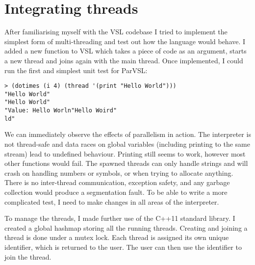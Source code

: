\section{Integrating threads}
\label{sec:babythreads}
After familiarising myself with the VSL codebase I tried to implement the simplest form of
multi-threading and test out how the language would behave. I added a new function to VSL
which takes a piece of code as an argument, starts a new thread and joins again with
the main thread. Once implemented, I could run the first and simplest unit test for ParVSL:

\begin{verbatim}
> (dotimes (i 4) (thread '(print "Hello World")))
"Hello World"
"Hello World"
"Value: Hello Worln"Hello Woird"
ld"
\end{verbatim}

We can immediately observe the effects of parallelism in action. The interpreter is not thread-safe and data races
on global variables (including printing to the same stream) lead to undefined behaviour. Printing
still seems to work, however most other functions would fail. The spawned threads can only handle strings
and will crash on handling numbers or symbols, or when trying to allocate anything.
There is no inter-thread communication, exception safety, and any garbage collection would produce a segmentation
fault. To be able to write a more complicated test, I need to make changes in all areas of the interpreter.

To manage the threads, I made further use of the C++11 standard library. I created a global hashmap storing
all the running threads. Creating and joining a thread is done under a mutex lock. Each thread is assigned its own unique
identifier, which is returned to the user. The user can then use the identifier to join the thread.


